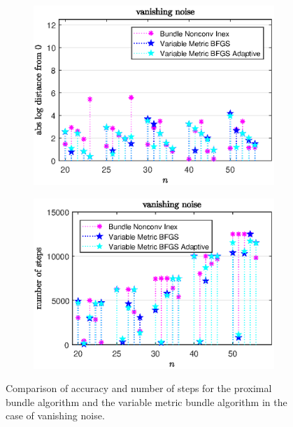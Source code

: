 \vspace{-1.5em}

\begin{figure}[H]
	\begin{subfigure}{0.49\textwidth}
		\includegraphics[width=\textwidth]{Pictures/Plots/vanishing_noise_b.eps}%
	\end{subfigure}%
	\hfill
	\begin{subfigure}{0.49\textwidth}
		\includegraphics[width=\textwidth]{Pictures/Plots/steps_vanishing_noise_b.eps}%
	\end{subfigure}
	\caption[Accuracy and number of steps: vanishing noise, higher dimensions]{Comparison of accuracy and number of steps for the proximal bundle algorithm and the variable metric bundle algorithm in the case of vanishing noise.}%
	\label{fig_van_noise_large}%
\end{figure}

